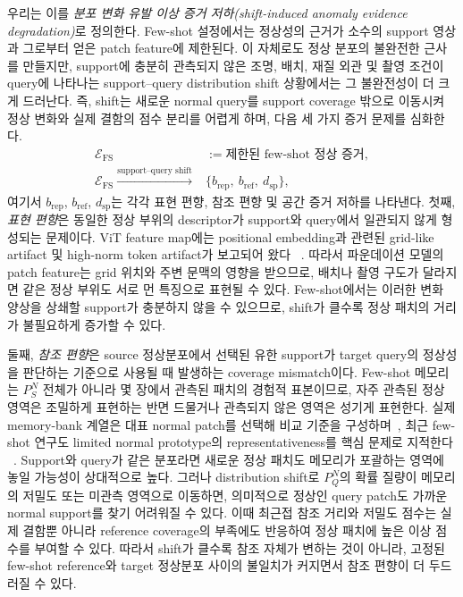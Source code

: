 우리는 이를 \emph{분포 변화 유발 이상 증거 저하(shift-induced anomaly
evidence degradation)}로 정의한다. Few-shot 설정에서는 정상성의 근거가
소수의 support 영상과 그로부터 얻은 patch feature에 제한된다. 이 자체로도
정상 분포의 불완전한 근사를 만들지만, support에 충분히 관측되지 않은 조명,
배치, 재질 외관 및 촬영 조건이 query에 나타나는 support--query distribution
shift 상황에서는 그 불완전성이 더 크게 드러난다. 즉, shift는 새로운 normal
query를 support coverage 밖으로 이동시켜 정상 변화와 실제 결함의 점수 분리를
어렵게 하며, 다음 세 가지 증거 문제를 심화한다.
\begin{equation}
  \begin{aligned}
    \mathcal E_{\mathrm{FS}}
      &:= \text{제한된 few-shot 정상 증거},\\
    \mathcal E_{\mathrm{FS}}
      \xrightarrow{\text{support--query shift}}
      &\{b_{\mathrm{rep}},\ b_{\mathrm{ref}},\ d_{\mathrm{sp}}\},
  \end{aligned}
  \label{eq:evidence_degradation}
\end{equation}
여기서 $b_{\mathrm{rep}}$, $b_{\mathrm{ref}}$, $d_{\mathrm{sp}}$는 각각 표현
편향, 참조 편향 및 공간 증거 저하를 나타낸다.
첫째, \emph{표현 편향}은 동일한 정상 부위의 descriptor가 support와 query에서
일관되지 않게 형성되는 문제이다. ViT feature map에는 positional embedding과
관련된 grid-like artifact 및 high-norm token artifact가 보고되어 왔다
~\cite{yang2024dvt,darcet2024registers}. 따라서 파운데이션 모델의 patch feature는 grid 위치와
주변 문맥의 영향을 받으므로, 배치나 촬영 구도가 달라지면 같은 정상 부위도
서로 먼 특징으로 표현될 수 있다. Few-shot에서는 이러한 변화 양상을 상쇄할
support가 충분하지 않을 수 있으므로, shift가 클수록 정상 패치의 거리가
불필요하게 증가할 수 있다.

둘째, \emph{참조 편향}은 source 정상분포에서 선택된 유한 support가 target
query의 정상성을 판단하는 기준으로 사용될 때 발생하는 coverage mismatch이다.
Few-shot 메모리는 $P_S^N$ 전체가 아니라 몇 장에서 관측된 패치의 경험적
표본이므로, 자주 관측된 정상 영역은 조밀하게 표현하는 반면 드물거나 관측되지
않은 영역은 성기게 표현한다. 실제 memory-bank 계열은 대표 normal patch를
선택해 비교 기준을 구성하며~\cite{roth2022patchcore}, 최근 few-shot 연구도
limited normal prototype의 representativeness를 핵심 문제로 지적한다
~\cite{li2026fastref}. Support와 query가 같은 분포라면 새로운 정상
패치도 메모리가 포괄하는 영역에 놓일 가능성이 상대적으로 높다. 그러나
distribution shift로 $P_Q^N$의 확률 질량이 메모리의 저밀도 또는 미관측 영역으로
이동하면, 의미적으로 정상인 query patch도 가까운 normal support를 찾기 어려워질 수
있다. 이때 최근접 참조 거리와 저밀도 점수는 실제 결함뿐 아니라 reference
coverage의 부족에도 반응하여 정상 패치에 높은 이상 점수를 부여할 수 있다.
따라서 shift가 클수록 참조 자체가 변하는 것이 아니라, 고정된 few-shot
reference와 target 정상분포 사이의 불일치가 커지면서 참조 편향이 더 두드러질
수 있다.

